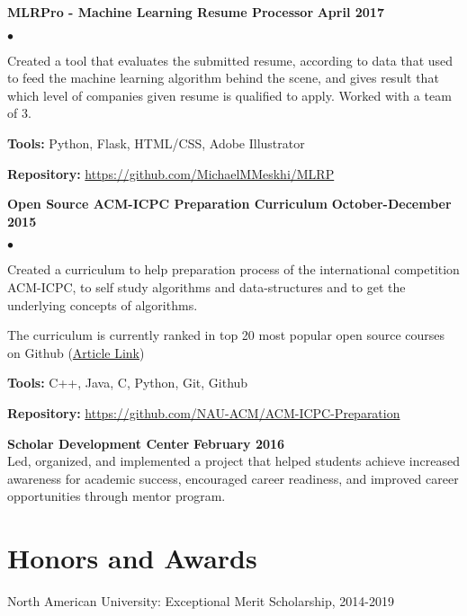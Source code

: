 \documentclass[margin,line]{res}
\newenvironment{list2}{
	\begin{list}{$\bullet$}{%
			\setlength{\itemsep}{0in}
			\setlength{\parsep}{0in} \setlength{\parskip}{0in}
			\setlength{\topsep}{0in} \setlength{\partopsep}{0in} 
			\setlength{\leftmargin}{0.2in}}}{\end{list}}
\begin{document}
\begin{resume}
		
		{\bf MLRPro - Machine Learning Resume Processor} \hfill {\bf April 2017}\\
		\vspace{-.3cm}
		\begin{list2}
			\item Created a tool that evaluates the submitted resume, according to data that used to feed the machine learning algorithm behind the scene, and gives result that which level of companies given resume is qualified to apply. Worked with a team of 3.
			\item \textbf{Tools:} Python, Flask, HTML/CSS, Adobe Illustrator
			\item \textbf{Repository:} \href{https://github.com/MichaelMMeskhi/MLRP}{https://github.com/MichaelMMeskhi/MLRP}
		\end{list2}
		
		{\bf Open Source ACM-ICPC Preparation Curriculum} \hfill {\bf October-December 2015}\\
		\vspace{-.3cm}
		\begin{list2}
			\item Created a curriculum to help preparation process of the international competition ACM-ICPC, to self study algorithms and data-structures and to get the underlying concepts of algorithms.
			\item The curriculum is currently ranked in top 20 most popular open source courses on Github (\href{https://education.github.community/t/20-of-the-most-popular-courses-on-github/27832}{Article Link})
			\item \textbf{Tools:} C++, Java, C, Python, Git, Github
			\item \textbf{Repository:} \href{https://github.com/NAU-ACM/ACM-ICPC-Preparation}{https://github.com/NAU-ACM/ACM-ICPC-Preparation}
		\end{list2}
		
		{\bf Scholar Development Center} \hfill {\bf February  2016}\\
		Led, organized, and implemented a project that helped students achieve increased awareness for academic success, encouraged
		career readiness, and improved career opportunities through mentor program.
		
		
		\section{\sc Honors and Awards}
		
		North American University: Exceptional Merit Scholarship, 2014-2019
		

\end{resume}
\end{document}
